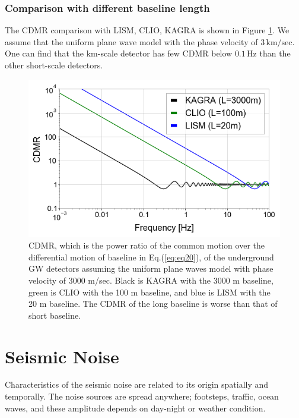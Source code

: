 \subsubsection{Comparison with different baseline length}
The CDMR comparison with LISM, CLIO, KAGRA is shown in Figure \ref{img:img301}. We assume that the uniform plane wave model with the phase velocity of $3\,\mathrm{km/sec}$. One can find that the km-scale detector has few CDMR below $0.1\,\mathrm{Hz}$ than the other short-scale detectors. 



\begin{figure}[p]
  \begin{center}
    \centering
    \includegraphics[width=12cm]{./img_chap3/img329.png}
    \caption{CDMR, which is the power ratio of the common motion over the differential motion of baseline in Eq.(\ref{eq:eq20}), of the underground GW detectors assuming the uniform plane waves model with phase velocity of 3000 m/sec. Black is KAGRA with the 3000 m baseline, green is CLIO with the 100 m baseline, and blue is LISM with the 20 m baseline. The CDMR of the long baseline is worse than that of short baseline.}\label{img:img301}
    \centering      
  \end{center}
\end{figure}


\newpage
\section{Seismic Noise}\label{sec:32}
Characteristics of the seismic noise are related to its origin spatially and temporally. The noise sources are spread anywhere; footsteps, traffic, ocean waves, and these amplitude depends on day-night or weather condition.

